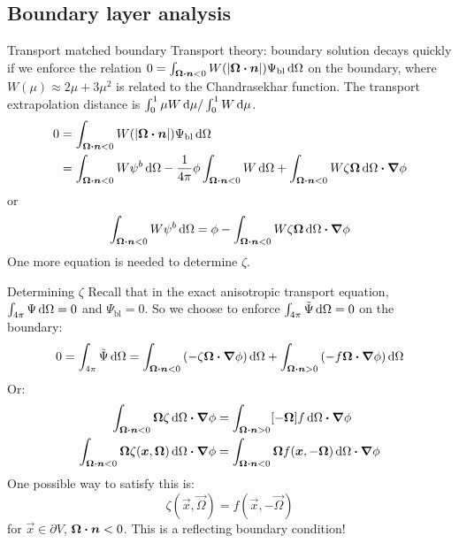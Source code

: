 \documentclass{beamer}
\begin{document}
\subsection{Boundary layer analysis}
\begin{frame}{Transport matched boundary}
  Transport theory: boundary solution decays quickly if we enforce the relation
  $0 = \int_{\bm{\Omega}\bm{\cdot} \bm{n} < 0} W(\left| \bm{\Omega}\bm{\cdot} \bm{n} \right|)
  \Psi_\mathrm{bl} \mathop{}\!\mathrm{d}\Omega$ on the boundary, where $W(\mu) \approx 2 \mu + 3
  \mu^2$ is related to the Chandrasekhar function. The transport extrapolation
  distance is $\int_0^1 \mu W \mathop{}\!\mathrm{d} \mu / \int_0^1 W \mathop{}\!\mathrm{d} \mu$.
  \begin{align*}
  0
  &= \int_{\bm{\Omega}\bm{\cdot} \bm{n} < 0} W(\left| \bm{\Omega}\bm{\cdot} \bm{n} \right|)
  \Psi_\mathrm{bl} \mathop{}\!\mathrm{d}\Omega
  \\
  &= \int_{\bm{\Omega}\bm{\cdot} \bm{n} < 0} W \psi^b \mathop{}\!\mathrm{d}\Omega
  - \frac{1}{4\pi} \phi \int_{\bm{\Omega}\bm{\cdot} \bm{n} < 0} W \mathop{}\!\mathrm{d}\Omega
  + \int_{\bm{\Omega}\bm{\cdot} \bm{n} < 0} W \zeta \bm{\Omega} \mathop{}\!\mathrm{d}\Omega
  \bm{\cdot} \bm{\nabla} \phi
  \end{align*}
  or
  \begin{equation} \label{eq:loBndy}
  \int_{\bm{\Omega}\bm{\cdot} \bm{n} < 0} W \psi^b \mathop{}\!\mathrm{d}\Omega
  = \phi - \int_{\bm{\Omega}\bm{\cdot} \bm{n} < 0} W \zeta \bm{\Omega} \mathop{}\!\mathrm{d}\Omega
  \bm{\cdot} \bm{\nabla} \phi
  \end{equation}
  One more equation is needed to determine $\zeta$.
\end{frame}

\begin{frame}{Determining $\zeta$}
 Recall that in the exact anisotropic transport equation,
 $\int_{4\pi}\Psi\mathop{}\!\mathrm{d}\Omega = 0$ and $\Psi_\mathrm{bl}=0$. So we choose to
 enforce $\int_{4\pi}\tilde\Psi\mathop{}\!\mathrm{d}\Omega = 0$ on the boundary:
 \begin{equation*}
   0 = \int_{4\pi} \tilde\Psi\mathop{}\!\mathrm{d}\Omega
   = \int_{\bm{\Omega}\bm{\cdot} \bm{n} < 0} \left(
   -\zeta\bm{\Omega}\bm{\cdot} \bm{\nabla} \phi \right)\mathop{}\!\mathrm{d}\Omega
   + \int_{\bm{\Omega}\bm{\cdot} \bm{n} > 0} \left(
   - f \bm{\Omega}\bm{\cdot} \bm{\nabla} \phi \right)\mathop{}\!\mathrm{d}\Omega
 \end{equation*}
 Or:
 \begin{align*}
   \int_{\bm{\Omega}\bm{\cdot} \bm{n} < 0}\bm{\Omega} \zeta\mathop{}\!\mathrm{d}\Omega
   \bm{\cdot} \bm{\nabla} \phi
   &= \int_{\bm{\Omega}\bm{\cdot} \bm{n} > 0} [-\bm{\Omega}]f \mathop{}\!\mathrm{d}\Omega
   \bm{\cdot} \bm{\nabla} \phi
   \\
   \int_{\bm{\Omega}\bm{\cdot} \bm{n} < 0} \bm{\Omega}
   \zeta(\bm{x}, \bm{\Omega}) \mathop{}\!\mathrm{d}\Omega \bm{\cdot} \bm{\nabla} \phi
   &= \int_{\bm{\Omega}\bm{\cdot} \bm{n} < 0}\bm{\Omega}
   f(\bm{x}, -\bm{\Omega}) \mathop{}\!\mathrm{d}\Omega \bm{\cdot} \bm{\nabla} \phi
 \end{align*}
 One possible way to satisfy this is:
 \begin{equation*}
   \zeta(\vec{x}, \vec{\Omega}) = f(\vec{x}, -\vec{\Omega}) 
 \end{equation*}
 for $\vec{x} \in \partial V$, $\bm{\Omega}\bm{\cdot} \bm{n} < 0$. This is a
 reflecting boundary condition!
\end{frame}
\end{document}
